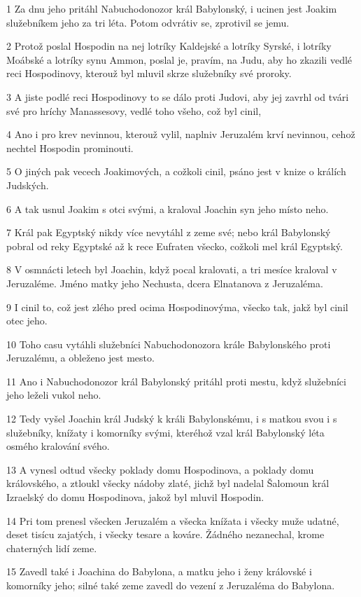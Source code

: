 \par 1 Za dnu jeho pritáhl Nabuchodonozor král Babylonský, i ucinen jest Joakim služebníkem jeho za tri léta. Potom odvrátiv se, zprotivil se jemu.
\par 2 Protož poslal Hospodin na nej lotríky Kaldejské a lotríky Syrské, i lotríky Moábské a lotríky synu Ammon, poslal je, pravím, na Judu, aby ho zkazili vedlé reci Hospodinovy, kterouž byl mluvil skrze služebníky své proroky.
\par 3 A jiste podlé reci Hospodinovy to se dálo proti Judovi, aby jej zavrhl od tvári své pro hríchy Manassesovy, vedlé toho všeho, což byl cinil,
\par 4 Ano i pro krev nevinnou, kterouž vylil, naplniv Jeruzalém krví nevinnou, cehož nechtel Hospodin prominouti.
\par 5 O jiných pak vecech Joakimových, a cožkoli cinil, psáno jest v knize o králích Judských.
\par 6 A tak usnul Joakim s otci svými, a kraloval Joachin syn jeho místo neho.
\par 7 Král pak Egyptský nikdy více nevytáhl z zeme své; nebo král Babylonský pobral od reky Egyptské až k rece Eufraten všecko, cožkoli mel král Egyptský.
\par 8 V osmnácti letech byl Joachin, když pocal kralovati, a tri mesíce kraloval v Jeruzaléme. Jméno matky jeho Nechusta, dcera Elnatanova z Jeruzaléma.
\par 9 I cinil to, což jest zlého pred ocima Hospodinovýma, všecko tak, jakž byl cinil otec jeho.
\par 10 Toho casu vytáhli služebníci Nabuchodonozora krále Babylonského proti Jeruzalému, a obleženo jest mesto.
\par 11 Ano i Nabuchodonozor král Babylonský pritáhl proti mestu, když služebníci jeho leželi vukol neho.
\par 12 Tedy vyšel Joachin král Judský k králi Babylonskému, i s matkou svou i s služebníky, knížaty i komorníky svými, kteréhož vzal král Babylonský léta osmého kralování svého.
\par 13 A vynesl odtud všecky poklady domu Hospodinova, a poklady domu královského, a ztloukl všecky nádoby zlaté, jichž byl nadelal Šalomoun král Izraelský do domu Hospodinova, jakož byl mluvil Hospodin.
\par 14 Pri tom prenesl všecken Jeruzalém a všecka knížata i všecky muže udatné, deset tisícu zajatých, i všecky tesare a kováre. Žádného nezanechal, krome chaterných lidí zeme.
\par 15 Zavedl také i Joachina do Babylona, a matku jeho i ženy královské i komorníky jeho; silné také zeme zavedl do vezení z Jeruzaléma do Babylona.
